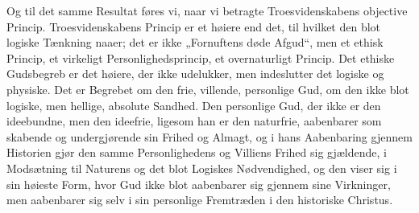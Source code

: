 \documentclass[12pt,a4paper]{book}
\newcommand{\opage}[1]{\marginnote{\footnotesize\textit{[#1]}}}
\begin{document}
Og til det samme Resultat føres vi, naar vi betragte Troesvidenskabens objective
Princip. Troesvidenskabens Princip er et høiere end det, til hvilket den blot
logiske Tænkning naaer; det er ikke „Fornuftens døde Afgud“, men et ethisk Princip, et virkeligt Personlighedsprincip, et overnaturligt Princip. Det ethiske
Gudsbegreb er det høiere, der ikke udelukker, men indeslutter det logiske og
physiske. Det er Begrebet om den frie, villende, personlige Gud, om den ikke blot
logiske, men hellige, absolute Sandhed. Den personlige Gud, der ikke er den
ideebundne, men den ideefrie, ligesom han er den naturfrie, aabenbarer som
skabende og undergjørende sin Frihed og Almagt, og i hans Aabenbaring gjennem
Historien gjør den samme Personlighedens og Villiens Frihed sig gjældende, i
Modsætning til Naturens og det blot Logiskes Nødvendighed, og den viser sig i sin
høieste Form, hvor Gud ikke blot aabenbarer sig gjennem \opage{47}sine Virkninger, men
aabenbarer sig selv i sin personlige Fremtræden i den historiske Christus.
\end{document}
